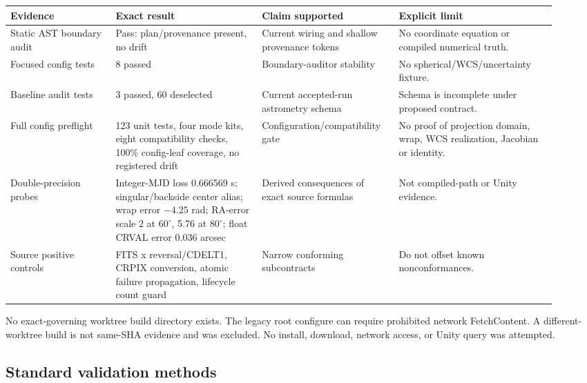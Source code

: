 \documentclass[11pt]{article}
\begin{document}
\begin{longtable}{L{0.18\linewidth}L{0.25\linewidth}L{0.22\linewidth}L{0.27\linewidth}}
\toprule
Evidence & Exact result & Claim supported & Explicit limit \\
\midrule
\endhead
Static AST boundary audit & Pass: plan/provenance present, no drift & Current wiring and shallow provenance tokens & No coordinate equation or compiled numerical truth. \\
Focused config tests & 8 passed & Boundary-auditor stability & No spherical/WCS/uncertainty fixture. \\
Baseline audit tests & 3 passed, 60 deselected & Current accepted-run astrometry schema & Schema is incomplete under proposed contract. \\
Full config preflight & 123 unit tests, four mode kits, eight compatibility checks, 100\% config-leaf coverage, no registered drift & Configuration/compatibility gate & No proof of projection domain, wrap, WCS realization, Jacobian or identity. \\
Double-precision probes & Integer-MJD loss 0.666569 s; singular/backside center alias; wrap error $-4.25$ rad; RA-error scale 2 at $60^\circ$, 5.76 at $80^\circ$; float CRVAL error 0.036 arcsec & Derived consequences of exact source formulas & Not compiled-path or Unity evidence. \\
Source positive controls & FITS x reversal/CDELT1, CRPIX conversion, atomic failure propagation, lifecycle count guard & Narrow conforming subcontracts & Do not offset known nonconformances. \\
\bottomrule
\end{longtable}

No exact-governing worktree build directory exists. The legacy root configure
can require prohibited network FetchContent. A different-worktree build is not
same-SHA evidence and was excluded. No install, download, network access, or
Unity query was attempted.

\subsection{Standard validation methods}
\end{document}
